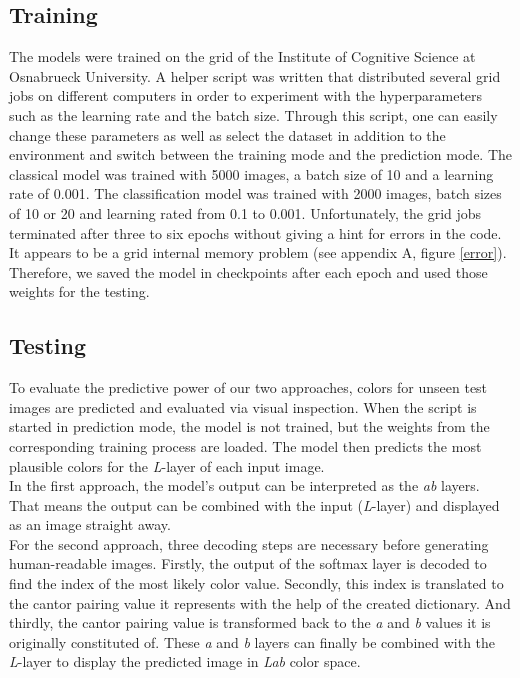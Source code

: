 \documentclass[12pt,letterpaper]{article}
\begin{document}
\subsection{Training}
The models were trained on the grid of the Institute of Cognitive Science at Osnabrueck University. A helper script was written that distributed several grid jobs on different computers in order to experiment with the hyperparameters such as the learning rate and the batch size. Through this script, one can easily change these parameters as well as select the dataset in addition to the environment and switch between the training mode and the prediction mode. The classical model was trained with 5000 images, a batch size of 10 and a learning rate of 0.001. The classification model was trained with 2000 images, batch sizes of 10 or 20 and learning rated from 0.1 to 0.001. Unfortunately, the grid jobs terminated after three to six epochs without giving a hint for errors in the code. It appears to be a grid internal memory problem (see appendix A, figure \ref{error}). Therefore, we saved the model in checkpoints after each epoch and used those weights for the testing.

\subsection{Testing}
To evaluate the predictive power of our two approaches, colors for unseen test images are predicted and evaluated via visual inspection. When the script is started in prediction mode, the model is not trained, but the weights from the corresponding training process are loaded. The model then predicts the most plausible colors for the \emph{L}-layer of each input image.\\
In the first approach, the model's output can be interpreted as the \emph{ab} layers. That means the output can be combined with the input (\emph{L}-layer) and displayed as an image straight away.\\
For the second approach, three decoding steps are necessary before generating human-readable images. Firstly, the output of the softmax layer is decoded to find the index of the most likely color value. Secondly, this index is translated to the cantor pairing value it represents with the help of the created dictionary. And thirdly, the cantor pairing value is transformed back to the \emph{a} and \emph{b} values it is originally constituted of. These \emph{a} and \emph{b} layers can finally be combined with the \emph{L}-layer to display the predicted image in \emph{Lab} color space.
\end{document}

